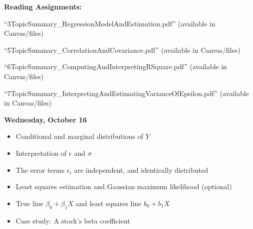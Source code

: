 \documentclass[11pt]{article}
\begin{document}
\begin{itemize}
\end{itemize}
%
%


\noindent\textbf{Reading Assignments:}

 ``3TopicSummary\_RegressionModelAndEstimation.pdf'' (available in Canvas/files)
	
	``5TopicSummary\_CorrelationAndCovariance.pdf'' (available in Canvas/files)
	
	``6TopicSummary\_ComputingAndInterpretingRSquare.pdf'' (available in Canvas/files)
	
	``7TopicSummary\_InterpretingAndEstimatingVarianceOfEpsilon.pdf'' (available in Canvas/files)


\vspace{5mm}
\noindent\textbf{\large Wednesday, October 16} 	

\begin{itemize}

\item Conditional and marginal distributions of  $Y$
\item Interpretation of $\epsilon$ and $\sigma$
\item The error terms $\epsilon_i$  are independent, and identically distributed 
\item Least squares estimation and Gaussian maximum likelihood (optional)
\item True line $\beta_0+\beta_1X$ and least squares line $b_0+b_1 X$

\item Case study: A stock's beta coefficient

\end{itemize}
\end{document}
